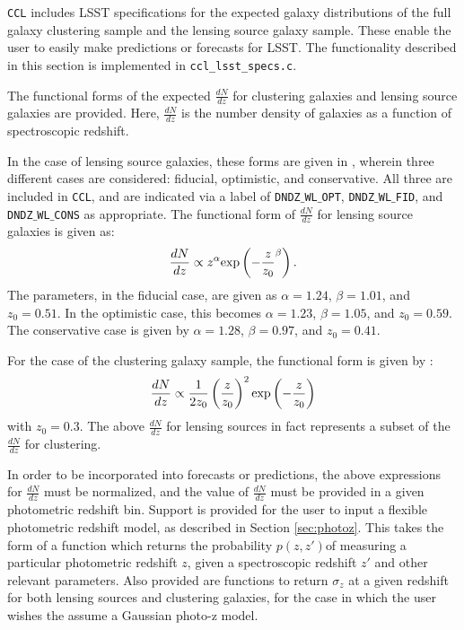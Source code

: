 \documentclass[\docopts]{\docclass}
\begin{document}
{\tt CCL} includes LSST specifications for the expected galaxy distributions of the full galaxy clustering sample and the lensing source galaxy sample. These enable the user to easily make predictions or forecasts for LSST. The functionality described in this section is implemented in {\tt ccl\_lsst\_specs.c}.

The functional forms of the expected $\frac{dN}{dz}$ for clustering galaxies and lensing source galaxies are provided. Here, $\frac{dN}{dz}$ is the number density of galaxies as a function of spectroscopic redshift.

In the case of lensing source galaxies, these forms are given in \cite{Chang2013}, wherein three different cases are considered: fiducial, optimistic, and conservative. All three are included in {\tt CCL}, and are indicated via a label of {\tt DNDZ$\_$WL$\_$OPT}, {\tt DNDZ$\_$WL$\_$FID}, and {\tt DNDZ$\_$WL$\_$CONS} as appropriate. The functional form of $\frac{dN}{dz}$ for lensing source galaxies is given as:
\begin{equation}
\frac{dN}{dz} \propto z^\alpha {\rm exp}\left(-\frac{z}{z_0}^\beta\right).
\label{dndz_src}
\end{equation}
The parameters, in the fiducial case, are given as $\alpha=1.24$, $\beta=1.01$, and $z_0=0.51$. In the optimistic case, this becomes $\alpha=1.23$, $\beta=1.05$, and $z_0=0.59$. The conservative case is given by $\alpha=1.28$, $\beta=0.97$, and $z_0=0.41$.

For the case of the clustering galaxy sample, the functional form is given by \cite{ScienceBook}:
\begin{equation}
\frac{dN}{dz} \propto \frac{1}{2z_0}\left(\frac{z}{z_0}\right)^2 {\rm exp}\left(-\frac{z}{z_0}\right)
\label{dndz_clust}
\end{equation}
with $z_0=0.3$. The above $\frac{dN}{dz}$ for lensing sources in fact represents a subset of the $\frac{dN}{dz}$ for clustering.

In order to be incorporated into forecasts or predictions, the above expressions for $\frac{dN}{dz}$ must be normalized, and the value of $\frac{dN}{dz}$ must be provided in a given photometric redshift bin. Support is provided for the user to input a flexible photometric redshift model, as described in Section \ref{sec:photoz}. This takes the form of a function which returns the probability $p(z,z')$of measuring a particular photometric redshift $z$, given a spectroscopic redshift $z'$ and other relevant parameters. Also provided are functions to return $\sigma_z$ at a given redshift for both lensing sources and clustering galaxies, for the case in which the user wishes the assume a Gaussian photo-z model.
\end{document}
